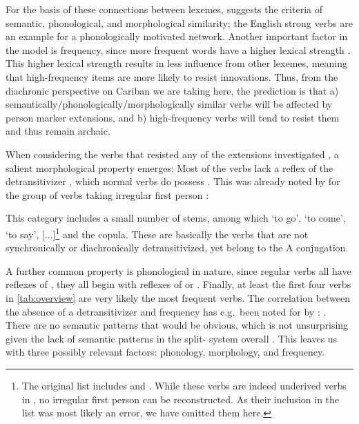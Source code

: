 For the basis of these connections between lexemes, \textcite[118]{bybee1985morphology} suggests the criteria of semantic, phonological, and morphological similarity; the English strong verbs are an example for a phonologically motivated network.
Another important factor in the model is frequency, since more frequent words have a higher lexical strength \parencite[119]{bybee1985morphology}.
This higher lexical strength results in less influence from other lexemes, meaning that high-frequency items are more likely to resist innovations.
Thus, from the diachronic perspective on Cariban we are taking here, the prediction is that a) semantically\slash{}phonologically\slash\hspace{0pt}morphologically similar verbs will be affected by person marker extensions, and b) high-frequency verbs will tend to resist them and thus remain archaic.

When considering the verbs that resisted any of the extensions investigated , a salient morphological property emerges:
Most of the verbs lack a reflex of the detransitivizer \detrz, which normal  verbs do possess .
This was already noted by \textcite{meira1998proto} for the group of \PTar verbs taking irregular first person :
\begin{quotebox}{\parencite[112]{meira1998proto}}
	This category includes a small number of stems, among which ‘to go’, ‘to come’, ‘to say’, [...]\footnote{The original list includes  and . While these verbs are indeed underived  verbs in \trio, no irregular first person  can be reconstructed. As their inclusion in the list was most likely an error, we have omitted them here.} and the copula. These are basically the verbs that are not synchronically or diachronically detransitivized, yet belong to the A conjugation.
\end{quotebox} %
%
A further common property is phonological in nature, since regular  verbs all have reflexes of \detrz, they all begin with reflexes of  or .
Finally, at least the first four verbs in \cref{tab:overview} are very likely the most frequent  verbs.
The correlation between the absence of a detransitivizer and frequency has e.g.\ been noted for \kalina by \textcite[75]{courtz2008carib}: .
%
There are no semantic patterns that would be obvious, which is not unsurprising given the lack of semantic patterns in the split- system overall .
This leaves us with three possibly relevant factors: phonology, morphology, and frequency.

